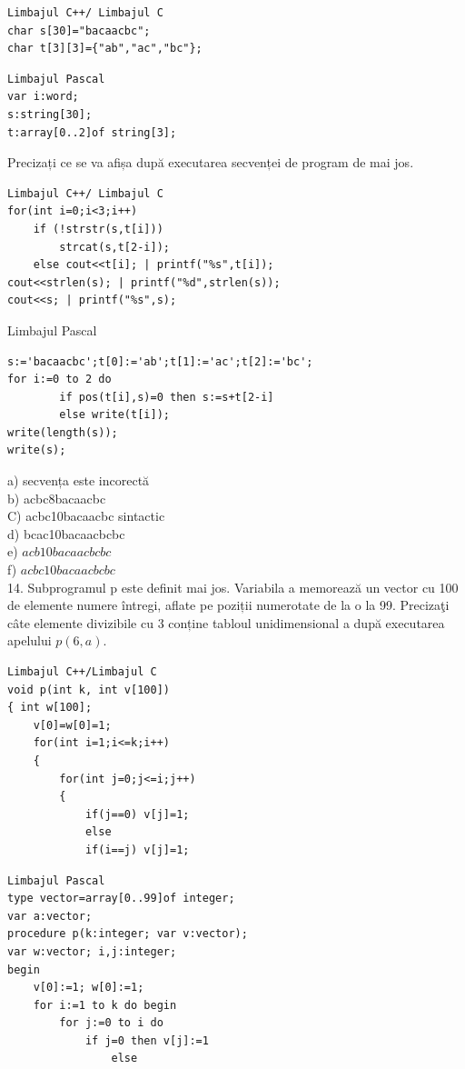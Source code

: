 \documentclass[10pt]{article}
\begin{document}
\begin{verbatim}
Limbajul C++/ Limbajul C
char s[30]="bacaacbc";
char t[3][3]={"ab","ac","bc"};
\end{verbatim}

\begin{verbatim}
Limbajul Pascal
var i:word;
s:string[30];
t:array[0..2]of string[3];
\end{verbatim}

Precizați ce se va afișa după executarea secvenței de program de mai jos.

\begin{verbatim}
Limbajul C++/ Limbajul C
for(int i=0;i<3;i++)
    if (!strstr(s,t[i]))
        strcat(s,t[2-i]);
    else cout<<t[i]; | printf("%s",t[i]);
cout<<strlen(s); | printf("%d",strlen(s));
cout<<s; | printf("%s",s);
\end{verbatim}

Limbajul Pascal

\begin{verbatim}
s:='bacaacbc';t[0]:='ab';t[1]:='ac';t[2]:='bc';
for i:=0 to 2 do
        if pos(t[i],s)=0 then s:=s+t[2-i]
        else write(t[i]);
write(length(s));
write(s);
\end{verbatim}

a) secvența este incorectă\\
b) acbc8bacaacbc\\
C) acbc10bacaacbc sintactic\\
d) bcac10bacaacbcbc\\
e) $a c b 10 b a c a a c b c b c$\\
f) $a c b c 10 b a c a a c b c b c$\\
14. Subprogramul p este definit mai jos. Variabila a memorează un vector cu 100 de elemente numere întregi, aflate pe poziții numerotate de la o la 99. Precizaţi câte elemente divizibile cu 3 conține tabloul unidimensional a după executarea apelului $p(6, a)$.

\begin{verbatim}
Limbajul C++/Limbajul C
void p(int k, int v[100])
{ int w[100];
    v[0]=w[0]=1;
    for(int i=1;i<=k;i++)
    {
        for(int j=0;j<=i;j++)
        {
            if(j==0) v[j]=1;
            else
            if(i==j) v[j]=1;
\end{verbatim}

\begin{verbatim}
Limbajul Pascal
type vector=array[0..99]of integer;
var a:vector;
procedure p(k:integer; var v:vector);
var w:vector; i,j:integer;
begin
    v[0]:=1; w[0]:=1;
    for i:=1 to k do begin
        for j:=0 to i do
            if j=0 then v[j]:=1
                else
\end{verbatim}
\end{document}
